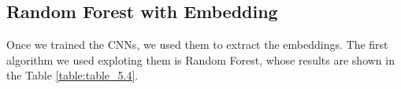 \begin{table}[h!]
\centering
{}
\caption[\acp{CNN} ensemble AUROC comparison]{AUROC values obtained using different Ensemble policies, compared to the best results achieved by a single CNN (reported in the first row). For each label, the highest AUROC is boldfaced.}
\label{table:table_5.3}
\end{table}


\subsection{Random Forest with Embedding}
\label{sec:rf_embedding_results}


Once we trained the \acp{CNN}, we used them to extract the embeddings. The first algorithm we used exploting them is Random Forest, whose results are shown in the Table \ref{table:table_5.4}.


